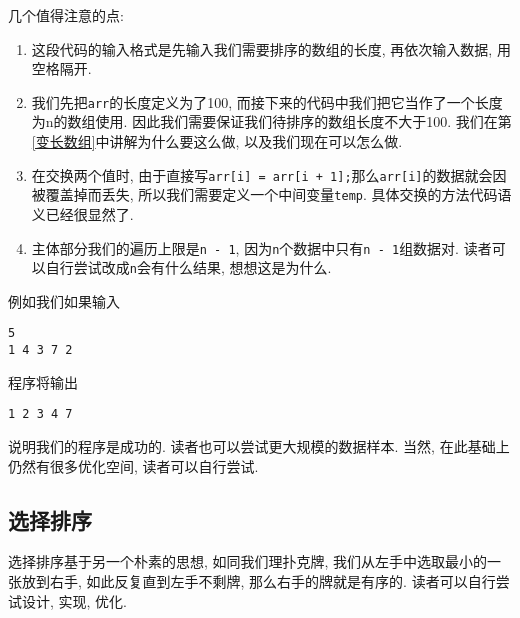             几个值得注意的点:
            \begin{enumerate}
                \item 这段代码的输入格式是先输入我们需要排序的数组的长度, 再依次输入数据, 用空格隔开.
                \item 我们先把\texttt{arr}的长度定义为了100, 而接下来的代码中我们把它当作了一个长度为n的数组使用. 因此我们需要保证我们待排序的数组长度不大于100. 我们在第\ref{变长数组}中讲解为什么要这么做, 以及我们现在可以怎么做.
                \item 在交换两个值时, 由于直接写\texttt{arr[i] = arr[i + 1];}那么\texttt{arr[i]}的数据就会因被覆盖掉而丢失, 所以我们需要定义一个中间变量\texttt{temp}. 具体交换的方法代码语义已经很显然了.
                \item 主体部分我们的遍历上限是\texttt{n - 1}, 因为\texttt{n}个数据中只有\texttt{n - 1}组数据对. 读者可以自行尝试改成\texttt{n}会有什么结果, 想想这是为什么.
            \end{enumerate}

            例如我们如果输入
\begin{lstlisting}
5
1 4 3 7 2
\end{lstlisting}

            程序将输出
\begin{lstlisting}
1 2 3 4 7 
\end{lstlisting}

            说明我们的程序是成功的. 读者也可以尝试更大规模的数据样本. 当然, 在此基础上仍然有很多优化空间, 读者可以自行尝试.

        \subsection*{选择排序}
            选择排序基于另一个朴素的思想, 如同我们理扑克牌, 我们从左手中选取最小的一张放到右手, 如此反复直到左手不剩牌, 那么右手的牌就是有序的. 读者可以自行尝试设计, 实现, 优化.
        
